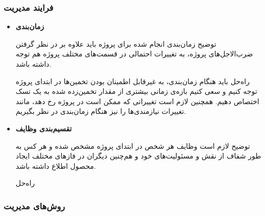 \subsubsection{فرایند مدیریت}

\begin{itemize}
	
	
\item 
\textbf{زمان‌بندی}

توضیح \hspace*{1cm} 
زمان‌بندی انجام شده برای پروژه باید علاوه بر در نظر گرفتن ضرب‌الاجل‌های پروژه، به تغییرات احتمالی در قسمت‌های مختلف پروژه هم توجه داشته باشد.

راه‌حل \hspace*{1cm} 
باید هنگام زمان‌بندی، به غیرقابل اطمینان بودن تخمین‌ها در ابتدای پروژه توجه کنیم و سعی کنیم بازه‌ی زمانی بیشتری از مقدار تخمین‌زده شده به یک تسک اختصاص دهیم. همچنین لازم است تغییراتی که ممکن است در پروژه رخ دهد، مانند تغییرات نیازمندی‌ها را نیز هنگام زمان‌بندی در نظر بگیریم.


\item 
\textbf{تقسیم‌بندی وظایف‌}

توضیح \hspace*{1cm} 
	لازم است وظایف هر شخص در ابتدای پروژه مشخص شده و هر کس به طور شفاف از نقش و مسئولیت‌های خود و هم‌چنین دیگران در فازهای مختلف ایجاد محصول اطلاع داشته باشد.

راه‌حل \hspace*{1cm} 
	
\end{itemize}

\subsubsection{روش‌های مدیریت}


